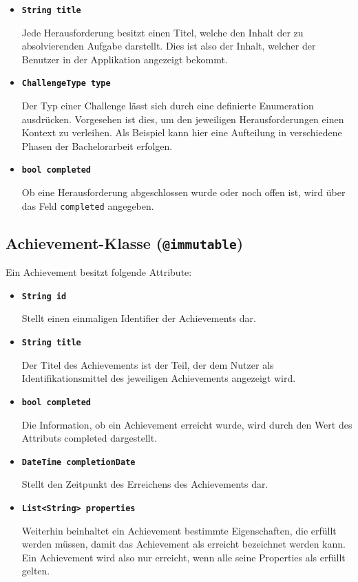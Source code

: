 \documentclass[bibliography=totoc,listof=totoc,BCOR=5mm,DIV=12,oneside]{scrbook}
\begin{document}
{\begin{itemize}
\item[] \texttt{\textbf{String title}}
\par Jede Herausforderung besitzt einen Titel, welche den Inhalt der zu absolvierenden Aufgabe darstellt. Dies ist also der Inhalt, welcher der Benutzer in der Applikation angezeigt bekommt.
\item[] \texttt{\textbf{ChallengeType type}}
\par Der Typ einer Challenge lässt sich durch eine definierte Enumeration ausdrücken. Vorgesehen ist dies, um den jeweiligen Herausforderungen einen Kontext zu verleihen. Als Beispiel kann hier eine Aufteilung in verschiedene Phasen der Bachelorarbeit erfolgen.
\item[] \texttt{\textbf{bool completed}}
\par Ob eine Herausforderung abgeschlossen wurde oder noch offen ist, wird über das Feld \texttt{completed} angegeben.
\end{itemize}

\subsection{Achievement-Klasse (\texttt{@immutable})}
\par Ein Achievement besitzt folgende Attribute:

\begin{itemize}

\item[] \texttt{\textbf{String id}}
\par Stellt einen einmaligen Identifier der Achievements dar.


\item[] \texttt{\textbf{String title}}
\par Der Titel des Achievements ist der Teil, der dem Nutzer als Identifikationsmittel des jeweiligen Achievements angezeigt wird.  

\item[] \texttt{\textbf{bool completed}}
\par Die Information, ob ein Achievement erreicht wurde, wird durch den Wert des Attributs completed dargestellt.

\item[] \texttt{\textbf{DateTime completionDate}}
\par Stellt den Zeitpunkt des Erreichens des Achievements dar.

\item[] \texttt{\textbf{List<String> properties}}
\par Weiterhin beinhaltet ein Achievement bestimmte Eigenschaften, die erfüllt werden müssen, damit das Achievement als erreicht bezeichnet werden kann. Ein Achievement wird also nur erreicht, wenn alle seine Properties als erfüllt gelten.  


\end{itemize}}
\end{document}
